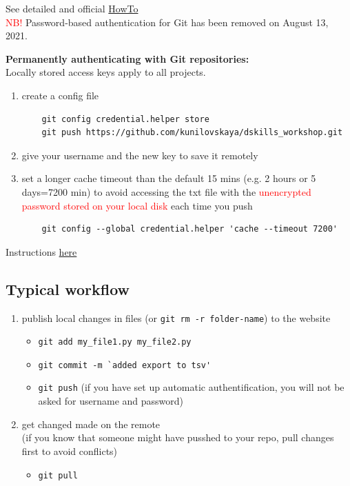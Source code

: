 \documentclass[a4paper,11pt]{article}
\begin{document}
See detailed and official  \href{https://docs.github.com/en/enterprise-server@3.4/get-started/getting-started-with-git/about-remote-repositories}{HowTo} \\

\textcolor{red}{NB!} Password-based authentication for Git has been removed on August 13, 2021.

\bigskip

\textbf{Permanently authenticating with Git repositories:} \\
Locally stored access keys apply to all projects.
\begin{enumerate}
	\item create a config file \\
	\begin{lstlisting}
	git config credential.helper store
	git push https://github.com/kunilovskaya/dskills_workshop.git
	\end{lstlisting}
	\item give your username and the new key to save it remotely
	\item set a longer cache timeout than the default 15 mins (e.g. 2 hours or 5 days=7200 min) to avoid accessing the txt file with the \textcolor{red}{unencrypted password stored on your local disk} each time you push
	\begin{lstlisting}
	git config --global credential.helper 'cache --timeout 7200' 
	\end{lstlisting}
	
\end{enumerate}

Instructions \href{https://stackoverflow.com/questions/8588768/how-do-i-avoid-the-specification-of-the-username-and-password-at-every-git-push}{here}

\subsection{Typical workflow}

\begin{enumerate}
	\item publish local changes in files (or \verb|git rm -r folder-name|) to the website
	\begin{itemize}
		\item \verb|git add my_file1.py my_file2.py|
		\item \verb|git commit -m `added export to tsv'|
		\item \verb|git push| (if you have set up automatic authentification, you will not be asked for username and password)
	\end{itemize}
	\item get changed made on the remote \\
	(if you know that someone might have pusshed to your repo, pull changes first to avoid conflicts)
	\begin{itemize}
		\item \verb|git pull|
	\end{itemize}
\end{enumerate}
\end{document}
